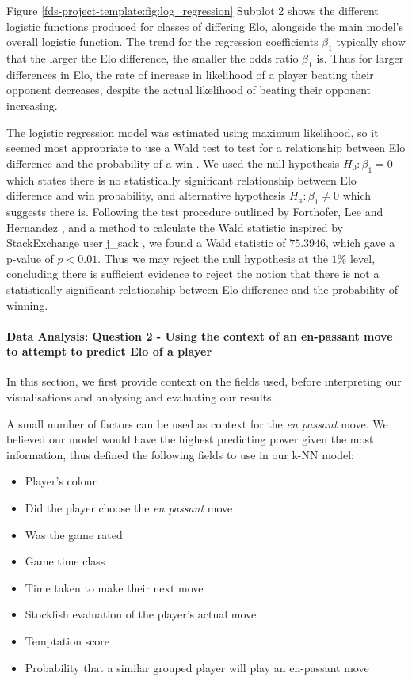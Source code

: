 \documentclass[10pt,a4paper]{article}
\begin{document}
\begin{multicols}{2}
Figure \ref{fds-project-template:fig:log_regression} Subplot 2 shows the different logistic functions produced for classes of differing Elo, alongside the main model's overall logistic function. The trend for the regression coefficients $\beta_{1}$ typically show that the larger the Elo difference, the smaller the odds ratio $\beta_{1}$ is. Thus for larger differences in Elo, the rate of increase in likelihood of a player beating their opponent decreases, despite the actual likelihood of beating their opponent increasing. \newline

The logistic regression model was estimated using maximum likelihood, so it seemed most appropriate to use a Wald test to test for a relationship between Elo difference and the probability of a win \cite{WaldTest}. We used the null hypothesis $H_{0}: \beta_{1} = 0$ which states there is no statistically significant relationship between Elo difference and win probability, and alternative hypothesis $H_{a}: \beta_{1} \neq 0$ which suggests there is. Following the test procedure outlined by Forthofer, Lee and Hernandez \cite{WaldTest}, and a method to calculate the Wald statistic inspired by StackExchange user j\_sack \cite{StackExchangeWaldTest}, we found a Wald statistic of $75.3946$, which gave a p-value of $p<0.01$. Thus we may reject the null hypothesis at the $1\%$ level, concluding there is sufficient evidence to reject the notion that there is not a statistically significant relationship between Elo difference and the probability of winning. \newline

\paragraph{Data Analysis: Question 2 - Using the context of an en-passant move to attempt to predict Elo of a player}

In this section, we first provide context on the fields used, before interpreting our visualisations and analysing and evaluating our results. \newline

A small number of factors can be used as context for the \textit{en passant} move. We believed our model would have the highest predicting power given the most information, thus defined the following fields to use in our k-NN model:

\begin{itemize}
\addtolength\itemsep{-2.5mm}
  \item Player's colour
  \item Did the player choose the \textit{en passant} move
  \item Was the game rated
  \item Game time class
  \item Time taken to make their next move
  \item Stockfish evaluation of the player's actual move
  \item Temptation score
  \item Probability that a similar grouped player will play an en-passant move
\end{itemize}


\end{multicols}
\end{document}
